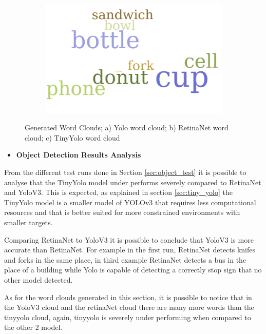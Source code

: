\begin{figure}[H]
      \begin{subfigure}{0.3\textwidth}
      \includegraphics[width=\textwidth]{Sections/4InitialWork/4_images_wordcloud/tiny_yolo_pic.png}\hfill
      \caption{}
      \end{subfigure}
      \caption{Generated Word Clouds; a) Yolo word cloud; b) RetinaNet word cloud; c) TinyYolo word cloud}
    \end{figure}

    \newpage
    
    \begin{itemize}
      \item \textbf{Object Detection Results Analysis}
    \end{itemize}

    

     From the different test runs done in Section \ref{sec:object_test} it is possible to analyse that the TinyYolo model under performs severely compared to RetinaNet and YoloV3. This is expected, as explained in section \ref{sec:tiny_yolo} the TinyYolo model is a smaller model of YOLOv3 that requires less computational resources and that is better suited for more constrained environments with smaller targets.

     Comparing RetinaNet to YoloV3 it is possible to conclude that YoloV3 is more accurate than RetinaNet. For example in the first run, RetinaNet detects knifes and forks in the same place, in third example RetinaNet detects a bus in the place of a building while Yolo is capable of detecting a correctly stop sign that no other model detected.

     As for the word clouds generated in this section, it is possible to notice that in the YoloV3 cloud and the retinaNet cloud there are many more words than the tinyyolo cloud, again, tinyyolo is severely under performing when compared to the other 2 model.
     
